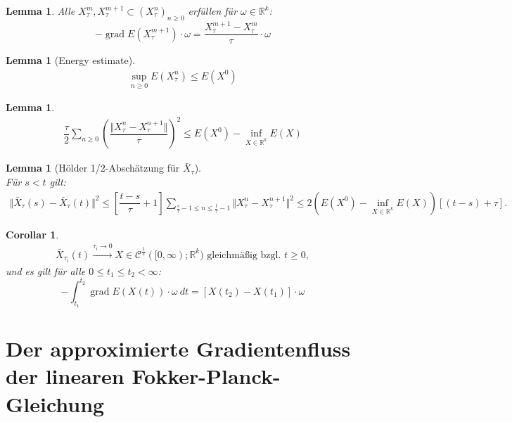 \documentclass[11pt,a4paper,notitlepage]{scrreprt}
\newcommand{\RR}{\mathbb{R}}
\newcommand{\grad}{\operatorname{grad}}
\newtheorem{cor}[defi]{Corollar}
\newtheorem{lem}[defi]{Lemma}
\begin{document}
\begin{lem}
Alle $X_\tau^m,X_\tau^{m+1}\subset(X_\tau^n)_{n\geq 0}$ erfüllen für $\omega\in\RR^k$: \\
\begin{equation}
-\grad E(X_\tau^{m+1})\cdot\omega= \dfrac{ X_\tau^{m+1}-X_\tau^m}{\tau}\cdot\omega
\end{equation}
\end{lem}

 

\begin{lem}[Energy estimate]
\begin{eqnarray*}
\sup_{n\geq 0}E(X_\tau^n)\leq E(X^0) \label{enest}
\end{eqnarray*}
\end{lem}


\begin{lem}
\begin{eqnarray*}
\dfrac{\tau}{2}\sum_{n\geq 0} \left(\dfrac{\Vert X_\tau^n-X_\tau^{n+1}\Vert}{\tau}\right)^2\leq E(X^0)-\inf_{X\in\RR^k} E(X)\label{totalsquare}
\end{eqnarray*}
\end{lem}


\begin{lem}[Hölder 1/2-Abschätzung für $\bar{X}_\tau$]  $~~$ \\
Für $s<t$ gilt:
\begin{eqnarray*}
\Vert \bar{X}_\tau(s)-\bar{X}_\tau(t)\Vert^2 \leq \left[\dfrac{t-s}{\tau}+1\right] \sum_{\frac{s}{\tau}-1\leq n \leq \frac{t}{\tau}-1} \Vert X^n_\tau- X_\tau^{n+1}\Vert^2 \leq 2(E(X^0)-\inf_{X\in\RR^k} E(X))[(t-s)+\tau]. \label{Hölder}
\end{eqnarray*}
\end{lem}

\begin{cor}
\begin{eqnarray*}
\bar{X}_{\tau_i}(t) \overset{\tau_i\to0}{\longrightarrow} X \in \mathcal{C}^{\frac{1}{2}}([0,\infty);\RR^k) \text{ gleichmäßig bzgl. }t\geq 0,
\end{eqnarray*}
und es gilt für alle $0\leq t_1\leq t_2<\infty$:
\begin{equation}
-\int_{t_1}^{t_2}\grad E(X(t))\cdot \omega~ dt = [X(t_2)-X(t_1)]\cdot\omega
\end{equation}
\end{cor}

\newpage
\section{Der approximierte Gradientenfluss der linearen Fokker-Planck-Gleichung}
\end{document}
